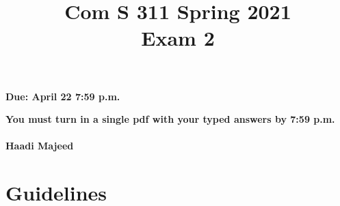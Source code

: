 \documentclass[11pt]{amsart}
\begin{document}


\title{
Com S 311 Spring 2021\\
Exam 2
}

\maketitle


\vspace{-.8cm}
\begin{center}
{\bf Due:  April 22 7:59 p.m.}

\smallskip
\textbf{You must turn in a single pdf with your typed answers by 7:59 p.m.}\\
\textbf{\\Haadi Majeed}\\
\end{center}

\medskip

\section*{Guidelines}
\end{document}
